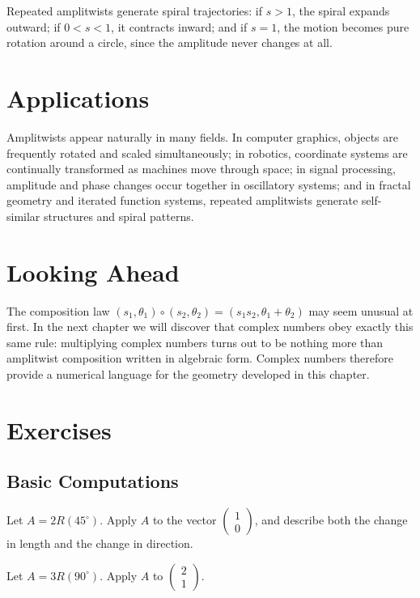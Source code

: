Repeated amplitwists generate spiral trajectories: if $s>1$, the spiral
expands outward; if $0<s<1$, it contracts inward; and if $s=1$, the
motion becomes pure rotation around a circle, since the amplitude never
changes at all.

\section{Applications}

Amplitwists appear naturally in many fields. In computer graphics,
objects are frequently rotated and scaled simultaneously; in robotics,
coordinate systems are continually transformed as machines move through
space; in signal processing, amplitude and phase changes occur together
in oscillatory systems; and in fractal geometry and iterated function
systems, repeated amplitwists generate self-similar structures and
spiral patterns.

\section{Looking Ahead}

The composition law $(s_1,\theta_1)\circ(s_2,\theta_2) =
(s_1s_2,\theta_1+\theta_2)$ may seem unusual at first. In the next
chapter we will discover that complex numbers obey exactly this same
rule: multiplying complex numbers turns out to be nothing more than
amplitwist composition written in algebraic form. Complex numbers
therefore provide a numerical language for the geometry developed in
this chapter.

\section{Exercises}

\subsection*{Basic Computations}
\begin{exercise}
Let $A = 2R(45^\circ)$. Apply $A$ to the vector $\begin{pmatrix} 1\\ 0
\end{pmatrix}$, and describe both the change in length and the change in
direction.
\end{exercise}

\begin{exercise}
Let $A = 3R(90^\circ)$. Apply $A$ to $\begin{pmatrix} 2\\ 1
\end{pmatrix}$.
\end{exercise}

